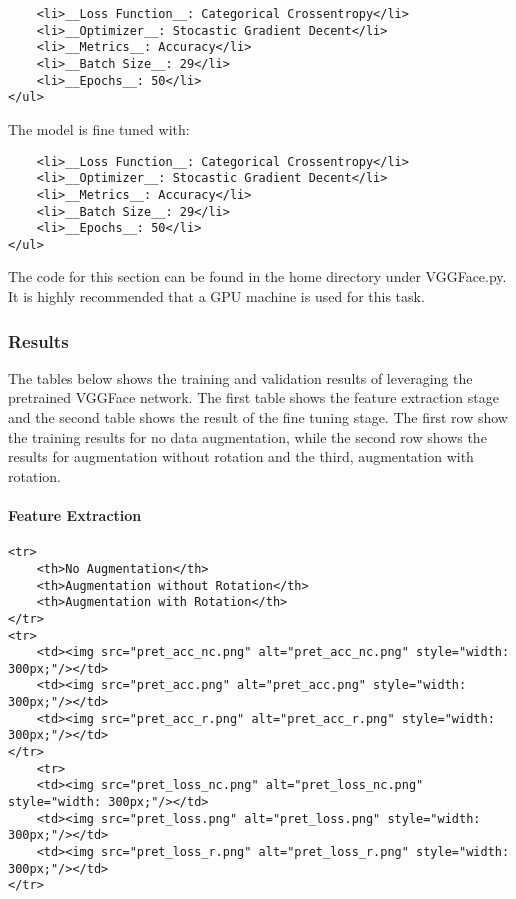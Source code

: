 \documentclass[11pt]{article}
\begin{document}
\begin{verbatim}
    <li>__Loss Function__: Categorical Crossentropy</li>
    <li>__Optimizer__: Stocastic Gradient Decent</li>
    <li>__Metrics__: Accuracy</li>
    <li>__Batch Size__: 29</li>
    <li>__Epochs__: 50</li>
</ul>
\end{verbatim}

The model is fine tuned with:

\begin{verbatim}
    <li>__Loss Function__: Categorical Crossentropy</li>
    <li>__Optimizer__: Stocastic Gradient Decent</li>
    <li>__Metrics__: Accuracy</li>
    <li>__Batch Size__: 29</li>
    <li>__Epochs__: 50</li>
</ul>
\end{verbatim}

The code for this section can be found in the home directory under
VGGFace.py. It is highly recommended that a GPU machine is used for this
task.

    \subsubsection{Results}\label{results}

The tables below shows the training and validation results of leveraging
the pretrained VGGFace network. The first table shows the feature
extraction stage and the second table shows the result of the fine
tuning stage. The first row show the training results for no data
augmentation, while the second row shows the results for augmentation
without rotation and the third, augmentation with rotation.

    \paragraph{Feature Extraction}\label{feature-extraction}

\begin{verbatim}
<tr>
    <th>No Augmentation</th>
    <th>Augmentation without Rotation</th>
    <th>Augmentation with Rotation</th>
</tr>
<tr>
    <td><img src="pret_acc_nc.png" alt="pret_acc_nc.png" style="width: 300px;"/></td>
    <td><img src="pret_acc.png" alt="pret_acc.png" style="width: 300px;"/></td>
    <td><img src="pret_acc_r.png" alt="pret_acc_r.png" style="width: 300px;"/></td>
</tr>
    <tr>
    <td><img src="pret_loss_nc.png" alt="pret_loss_nc.png" style="width: 300px;"/></td>
    <td><img src="pret_loss.png" alt="pret_loss.png" style="width: 300px;"/></td>
    <td><img src="pret_loss_r.png" alt="pret_loss_r.png" style="width: 300px;"/></td>
</tr>
\end{verbatim}
\end{document}
